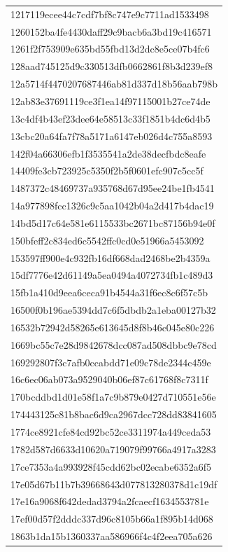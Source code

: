 \begin{tabular}{l}
1217119ecee44c7cdf7bf8c747e9c7711ad1533498 \\
1260152ba4fe4430daff29c9bacb6a3bd19c416571 \\
1261f2f753909e635bd55fbd13d2dc8e5ce07b4fc6 \\
128aad745125d9c330513dfb0662861f8b3d239ef8 \\
12a5714f4470207687446ab81d337d18b56aab798b \\
12ab83e37691119ce3f1ea14f97115001b27ce74de \\
13c4df4b43ef23dee64e58513c33f1851b4dc6d4b5 \\
13cbc20a64fa7f78a5171a6147eb026d4c755a8593 \\
142f04a66306efb1f3535541a2de38decfbdc8eafe \\
14409fe3cb723925c5350f2b5f0601efc907c5cc5f \\
1487372c48469737a935768d67d95ee24be1fb4541 \\
14a977898fcc1326c9c5aa1042b04a2d417b4dac19 \\
14bd5d17c64e581e6115533bc2671bc87156b94e0f \\
150bfeff2c834ed6c5542ffc0cd0e51966a5453092 \\
153597ff900e4c932fb16df668dad2468be2b4359a \\
15df7776e42d61149a5ea0494a4072734fb1c489d3 \\
15fb1a410d9eea6ceca91b4544a31f6ec8c6f57c5b \\
16500f0b196ae5394dd7c6f5dbdb2a1eba00127b32 \\
16532b72942d58265e613645d8f8b46c045e80c226 \\
1669bc55c7e28d9842678dcc087ad508dbbc9e78cd \\
169292807f3c7afb0ccabdd71e09c78de2344c459e \\
16c6ec06ab073a9529040b06ef87c61768f8c7311f \\
170bcddbd1d01e58f1a7c9b879e0427d710551e56e \\
174443125c81b8bac6d9ca2967dcc728dd83841605 \\
1774ce8921cfe84cd92bc52ce3311974a449ceda53 \\
1782d587d6633d10620a719079f99766a4917a3283 \\
17ce7353a4a993928f45cdd62bc02ecabe6352a6f5 \\
17e05d67b11b7b39668643d077813280378d1c19df \\
17e16a9068f642dedad3794a2fcaecf1634553781e \\
17ef00d57f2dddc337d96c8105b66a1f895b14d068 \\
1863b1da15b1360337aa586966f4c4f2eea705a626 \\

\end{tabular}
